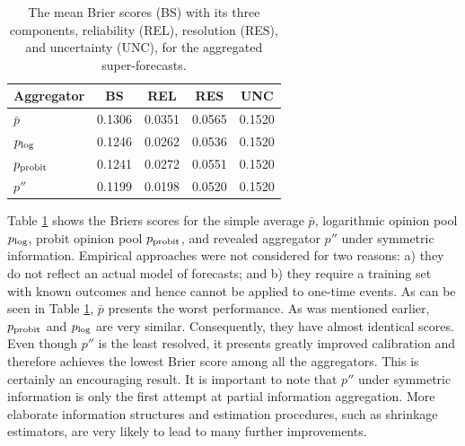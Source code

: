 \documentclass[12pt]{article}
\theoremstyle{definition}
\theoremstyle{definition}
\def\probit{p_{\rm probit}}
\def\plog{p_{\rm log}}
\begin{document}
 
\begin{table}[t]
\centering
\caption{The mean Brier scores (BS) with its three components, reliability (REL), resolution (RES), and uncertainty (UNC), for the aggregated super-forecasts.}
\begin{tabular}{lcccc}
  \hline\hline
Aggregator & BS & REL & RES & UNC \\ 
  \hline
$\bar{p}$ & 0.1306 & 0.0351 & 0.0565 & 0.1520 \\ 
 $\plog$ & 0.1246 & 0.0262 & 0.0536 & 0.1520 \\ 
 $\probit$ & 0.1241 & 0.0272 & 0.0551 & 0.1520 \\ 
 $p''$ & 0.1199 & 0.0198 & 0.0520 & 0.1520 \\ 
   \hline
\end{tabular}
\label{BrierTable}
\end{table}

Table \ref{BrierTable} shows the Briers scores for the simple average $\bar{p}$, logarithmic opinion pool $\plog$, probit opinion pool $\probit$, and revealed aggregator $p''$ under symmetric
information. Empirical approaches were not considered for two
reasons: a) they do not reflect an actual model of forecasts; and b)
they require a training set with known outcomes and hence cannot be
applied to one-time events. As can be seen in Table \ref{BrierTable}, $\bar{p}$ presents the worst performance. As was
mentioned earlier, $\probit$ and $\plog$ are
very similar. Consequently, they have almost identical scores. Even
though $p''$ is the least resolved, it presents
greatly improved calibration and therefore achieves the lowest Brier
score among all the aggregators. This is certainly an encouraging
result. It is important to note that $p''$
under symmetric information is only the first attempt at partial
information aggregation. 
More elaborate information structures and
estimation procedures, such as shrinkage estimators, are very likely to lead to many further
improvements.

\end{document}
